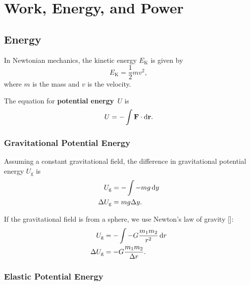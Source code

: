 \chapter{Work, Energy, and Power}


\section{Energy}

In Newtonian mechanics, the kinetic energy \(E_\mathrm{K}\) is given by
\begin{equation} \label{eq:linear-kinetic-energy}
    E_\mathrm{K} = \frac{1}{2} m v^2,
\end{equation}
where \(m\) is the mass and \(v\) is the velocity.

The equation for \textbf{potential energy}~\(U\) is
\begin{equation} \label{eq:potential-energy}
    U = - \int \vec{F} \cdot \odif{\vec{r}}.
\end{equation}

\subsection{Gravitational Potential Energy}

Assuming a constant gravitational field,
the difference in gravitational potential energy \(U_\mathrm{g}\) is
\begin{equation}
    \begin{aligned}
        U_\mathrm{g} &= - \int - m g \odif{y} \\
        \Delta{U_\mathrm{g}} &= m g \Delta{y}.
    \end{aligned}
\end{equation}

If the gravitational field is from a sphere,
we use Newton's law of gravity []:
\begin{equation}
    \begin{aligned}
        U_\mathrm{g} &= - \int - G \frac{m_1 m_2}{r^2} \odif{r} \\
        \Delta{U_\mathrm{g}} &= - G \frac{m_1 m_2}{\Delta{r}}.
    \end{aligned}
\end{equation}

\subsection{Elastic Potential Energy}

